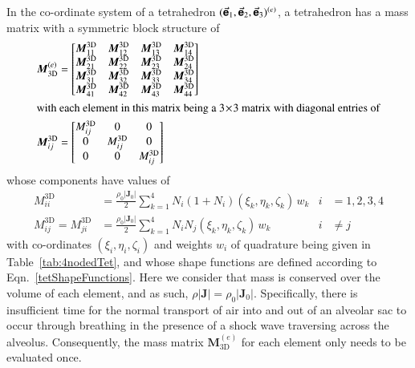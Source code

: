 In the co-ordinate system of a tetrahedron $( \vec{\boldsymbol{\mathsf{e}}}_1 , \vec{\boldsymbol{\mathsf{e}}}_2 , \vec{\boldsymbol{\mathsf{e}}}_3  )^{(e)}$, a tetrahedron has a mass matrix with a symmetric block structure of
\begin{subequations}
    \begin{align}
    \boldsymbol{M}^{(e)}_{\mathrm{3D}} & = 
    \begin{bmatrix}
    \boldsymbol{M}^{\mathrm{3D}}_{11} & \boldsymbol{M}^{\mathrm{3D}}_{12} & 
    \boldsymbol{M}^{\mathrm{3D}}_{13} & \boldsymbol{M}^{\mathrm{3D}}_{14} \\
    \boldsymbol{M}^{\mathrm{3D}}_{21} & \boldsymbol{M}^{\mathrm{3D}}_{22} & 
    \boldsymbol{M}^{\mathrm{3D}}_{23} & \boldsymbol{M}^{\mathrm{3D}}_{24} \\
    \boldsymbol{M}^{\mathrm{3D}}_{31} & \boldsymbol{M}^{\mathrm{3D}}_{32} & 
    \boldsymbol{M}^{\mathrm{3D}}_{33} & \boldsymbol{M}^{\mathrm{3D}}_{34} \\
    \boldsymbol{M}^{\mathrm{3D}}_{41} & \boldsymbol{M}^{\mathrm{3D}}_{42} & 
    \boldsymbol{M}^{\mathrm{3D}}_{43} & \boldsymbol{M}^{\mathrm{3D}}_{44} 
    \end{bmatrix} \\
    \intertext{with each element in this matrix being a $3 \! \times \! 3$ matrix with diagonal entries of}
    \boldsymbol{M}^{\mathrm{3D}}_{ij} & = 
    \begin{bmatrix}
    M^{\mathrm{3D}}_{ij} & 0 & 0 \\
    0 & M^{\mathrm{3D}}_{ij} & 0 \\
    0 & 0 & M^{\mathrm{3D}}_{ij}
    \end{bmatrix}
    \end{align}
\end{subequations}
whose components have values of
\begin{subequations}
    \begin{align}
    M_{ii}^{\mathrm{3D}} & = 
    \frac{\rho_0 | \mathbf{J}_0 |}{2} \sum_{k=1}^4 N_i ( 1 + 
    N_i ) ( \xi_k , \eta_k , \zeta_k ) \, w_k & i & = 1,2,3,4 \\
    M_{ij}^{\mathrm{3D}} = M_{ji}^{\mathrm{3D}} & =
    \frac{\rho_0 | \mathbf{J}_0 |}{2} \sum_{k=1}^4
    N_i N_j (\xi_k , \eta_k , \zeta_k) \, w_k & i & \neq j
    \end{align}
\end{subequations}
with co-ordinates $( \xi_i , \eta_i , \zeta_i )$ and weights $w_i$ of quadrature being given in Table~\ref{tab:4nodedTet}, and whose shape functions are defined according to Eqn.~\eqref{tetShapeFunctions}.  Here we consider that mass is conserved over the volume of each element, and as such, $\rho | \mathbf{J} | = \rho_0 | \mathbf{J}_0 |$.  Specifically, there is insufficient time for the normal transport of air into and out of an alveolar sac to occur through breathing in the presence of a shock wave traversing across the alveolus.   Consequently, the mass matrix $\boldsymbol{M}^{(e)}_{\mathrm{3D}}$ for each element only needs to be evaluated once.


